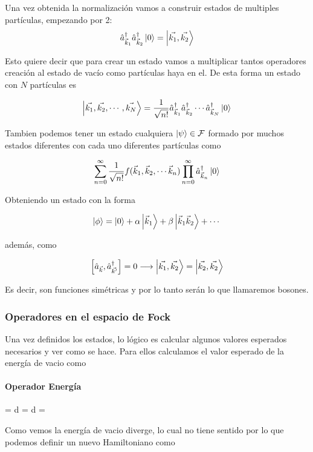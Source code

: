 Una vez obtenida la normalización vamos a construir estados de multiples partículas, empezando por 2:
\[\hat{a}^{\dagger}_{\vec{k}_{1}}\hat{a}^{\dagger}_{\vec{k}_{2}}\ket{0}=\ket{\vec{k_{1}}, \vec{k_{2}}}\]

Esto quiere decir que para crear un estado vamos a multiplicar tantos operadores creación al estado de vacío como partículas haya en el. De esta forma un estado con $N$ partículas es 

\[\ket{\vec{k_{1}}, \vec{k_{2}}, \cdots, \vec{k_{N}}}=\frac{1}{\sqrt{n!}} \hat{a}^{\dagger}_{\vec{k}_{1}}\hat{a}^{\dagger}_{\vec{k}_{2}}\cdots \hat{a}^{\dagger}_{\vec{k}_{N}}\ket{0}\]

Tambien podemos tener un estado cualquiera $\ket{\psi}\in \mathcal{F}$ formado por muchos estados diferentes con cada uno diferentes partículas como 

\[\sum_{n=0}^{\infty}\frac{1}{\sqrt{n!}} f(\vec{k}_{1}, \vec{k}_{2},\cdots \vec{k}_{n}) \prod_{n=0}^{\infty}\hat{a}^{\dagger}_{\vec{k}_{n}} \ket{0}\]

Obteniendo un estado con la forma 

\[\ket{\phi}= \ket{0}+ \alpha\ket{\vec{k}_{1}}+\beta\ket{\vec{k}_{1} \vec{k}_{2}} + \cdots\]

además, como 

\[\comm{\hat{a}_{\vec{k}}}{\hat{a}^{\dagger}_{\vec{k'}}}=0 \longrightarrow \ket{\vec{k_{1}}, \vec{k_{2}}}=\ket{\vec{k_{2}}, \vec{k_{2}}}\]

Es decir, son funciones simétricas y por lo tanto serán lo que llamaremos bosones.

\subsubsection{Operadores en el espacio de Fock}
Una vez definidos los estados, lo lógico es calcular algunos valores esperados necesarios y ver como se hace. Para ellos calculamos el valor esperado de la energía de vacio como 
\paragraph{Operador Energía}
\begin{DispWithArrows}[format=c, displaystyle]
= \int d  = \int d = \infty
\end{DispWithArrows}

Como vemos la energía de vacio diverge, lo cual no tiene sentido por lo que podemos definir un nuevo Hamiltoniano como 

